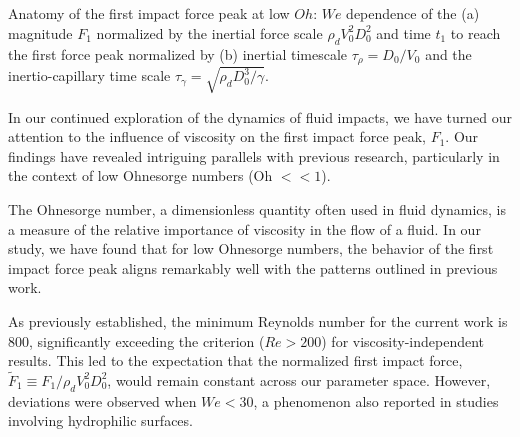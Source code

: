 \documentclass[]{article}
\title{}
\author{}
\begin{document}
\maketitle

\begin{abstract}

\end{abstract}

\section{}
Anatomy of the first impact force peak at low $Oh$: $We$ dependence of the (a) magnitude $F_1$ normalized by the inertial force scale $\rho_dV_0^2D_0^2$ and time $t_1$ to reach the first force peak normalized by (b) inertial timescale $\tau_\rho = D_0/V_0$ and the inertio-capillary time scale $\tau_\gamma = \sqrt{\rho_dD_0^3/\gamma}$.


In our continued exploration of the dynamics of fluid impacts, we have turned our attention to the influence of viscosity on the first impact force peak, $F_1$. Our findings have revealed intriguing parallels with previous research, particularly in the context of low Ohnesorge numbers (Oh $<< 1$).

The Ohnesorge number, a dimensionless quantity often used in fluid dynamics, is a measure of the relative importance of viscosity in the flow of a fluid. In our study, we have found that for low Ohnesorge numbers, the behavior of the first impact force peak aligns remarkably well with the patterns outlined in previous work.

As previously established, the minimum Reynolds number for the current work is $800$, significantly exceeding the criterion ($Re > 200$) for viscosity-independent results. This led to the expectation that the normalized first impact force, $\tilde{F}_1 \equiv F_1/\rho_d V_0^2D_0^2$, would remain constant across our parameter space. However, deviations were observed when $We < 30$, a phenomenon also reported in studies involving hydrophilic surfaces.
\end{document}
